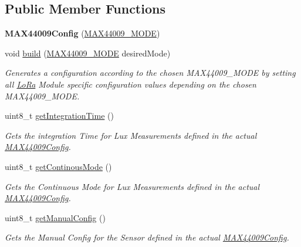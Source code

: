 \subsection*{Public Member Functions}
\begin{DoxyCompactItemize}
\item 
\hypertarget{class_m_a_x44009_config_a7ba14821841b8769bda1796a60d10b00}{}{\bfseries M\+A\+X44009\+Config} (\hyperlink{_m_a_x44009_config_8h_a2c5c90cfcbd78cedaaf2c20e01b00b56}{M\+A\+X44009\+\_\+\+M\+O\+D\+E})\label{class_m_a_x44009_config_a7ba14821841b8769bda1796a60d10b00}

\item 
void \hyperlink{class_m_a_x44009_config_a2879fcff8331e54ab1ee8bf54a386f6e}{build} (\hyperlink{_m_a_x44009_config_8h_a2c5c90cfcbd78cedaaf2c20e01b00b56}{M\+A\+X44009\+\_\+\+M\+O\+D\+E} desired\+Mode)
\begin{DoxyCompactList}\small\item\em Generates a configuration according to the chosen M\+A\+X44009\+\_\+\+M\+O\+D\+E by setting all \hyperlink{class_lo_ra}{Lo\+Ra} Module specific configuration values depending on the chosen M\+A\+X44009\+\_\+\+M\+O\+D\+E. \end{DoxyCompactList}\item 
uint8\+\_\+t \hyperlink{class_m_a_x44009_config_a699f0d5e7ec64e97e7c544eea9378932}{get\+Integration\+Time} ()
\begin{DoxyCompactList}\small\item\em Gets the integration Time for Lux Measurements defined in the actual \hyperlink{class_m_a_x44009_config}{M\+A\+X44009\+Config}. \end{DoxyCompactList}\item 
uint8\+\_\+t \hyperlink{class_m_a_x44009_config_aa01a44988bd5c806536d698b8add77e1}{get\+Continous\+Mode} ()
\begin{DoxyCompactList}\small\item\em Gets the Continuous Mode for Lux Measurements defined in the actual \hyperlink{class_m_a_x44009_config}{M\+A\+X44009\+Config}. \end{DoxyCompactList}\item 
uint8\+\_\+t \hyperlink{class_m_a_x44009_config_ac6df00bd34bf33421560111530810a8a}{get\+Manual\+Config} ()
\begin{DoxyCompactList}\small\item\em Gets the Manual Config for the Sensor defined in the actual \hyperlink{class_m_a_x44009_config}{M\+A\+X44009\+Config}. \end{DoxyCompactList}\item 

\end{DoxyCompactItemize}
